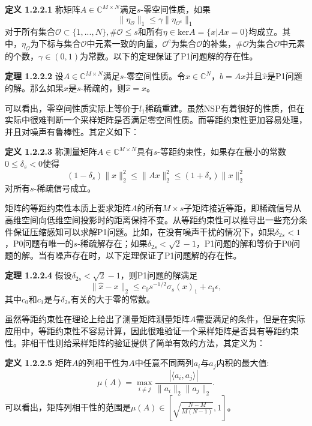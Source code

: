\noindent\textbf{定义 1.2.2.1} 称矩阵$A\in \mathbb{C}^{M\times N}$满足$s$-零空间性质，如果
$$\|\eta_\mathcal{O}\|_1\leq \gamma\|\eta_{\mathcal{O}^c}\|_1$$
对于所有集合$\mathcal{O}\subset\{1,...,N\},\#\mathcal{O}\leq s$和所有$\eta\in \mathrm{ker}A=\{x|Ax=0\}$均成立。其中，$\eta_\mathcal{O}$为下标与集合$\mathcal{O}$中元素一致的向量，$\mathcal{O}^c$为集合$\mathcal{O}$的补集，$\#\mathcal{O}$为集合$\mathcal{O}$中元素的个数，$\gamma\in (0,1)$为常数。以下的定理保证了P1问题解的存在性。

\noindent\textbf{定理 1.2.2.2} 设$A\in \mathbb{C}^{M\times N}$满足$s$-零空间性质。令$x\in \mathbb{C}^N$，$b=Ax$并且$\hat{x}$是P1问题的解。那么如果$x$是$s$-稀疏的，则$\hat{x}=x$。

可以看出，零空间性质实际上等价于$l_1$稀疏重建。虽然NSP有着很好的性质，但在实际中很难判断一个采样矩阵是否满足零空间性质。而等距约束性更加容易处理，并且对噪声有鲁棒性。其定义如下：

\noindent\textbf{定义 1.2.2.3} 称测量矩阵$A\in \mathbb{C}^{M\times N}$具有$s$-等距约束性，如果存在最小的常数$0\leq\delta_s<0$使得
\begin{equation}
	(1-\delta_s)\|x\|_2^2\leq \|Ax\|_2^2\leq (1+\delta_s)\|x\|^2_2
\end{equation}
对所有$s$-稀疏信号成立。

矩阵的等距约束性本质上要求矩阵$A$的所有$M\times s$子矩阵接近等距，即稀疏信号从高维空间向低维空间投影时的距离保持不变。从等距约束性可以推导出一些充分条件保证压缩感知可以求解P1问题。比如，在没有噪声干扰的情况下，如果$\delta_{2s}<1$，P0问题有唯一的$s$-稀疏解存在；如果$\delta_{2s}<\sqrt{2}-1$，P1问题的解和等价于P0问题的解。当有噪声存在时，以下定理保证了P1问题解的存在性。

\noindent\textbf{定理 1.2.2.4} 假设$\delta_{2s}<\sqrt{2}-1$，则P1问题的解满足
$$\|\hat{x}-x\|_2\leq c_0s^{-1/2}\sigma_s(x)_1+c_1\epsilon,$$
其中$c_0$和$c_1$是与$\delta_{2s}$有关的大于零的常数。

虽然等距约束性在理论上给出了测量矩阵测量矩阵$A$需要满足的条件，但是在实际应用中，等距约束性不容易计算，因此很难验证一个采样矩阵是否具有等距约束性。非相干性则给采样矩阵的验证提供了简单有效的方法，其定义为：

\noindent\textbf{定义 1.2.2.5} 
矩阵$A$的列相干性为$A$中任意不同两列$a_i$与$a_j$内积的最大值:
\begin{equation}
	\mu(A) = \max_{i\neq j}\frac{|\langle a_i,a_j\rangle|}{\|a_i\|_2\|a_j\|_2}.
\end{equation}
可以看出，矩阵列相干性的范围是$\mu(A)\in [\sqrt{\frac{N-M}{M(N-1)}},1]$。

